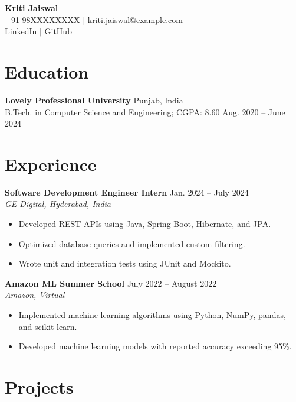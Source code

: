 \documentclass[letterpaper,11pt]{article}
\begin{document}
\begin{center}
    {\LARGE \textbf{Kriti Jaiswal}}\\[4pt]
    +91 98XXXXXXXX \quad $|$ \quad
    \href{mailto:kriti.jaiswal@example.com}{kriti.jaiswal@example.com}\\
    \href{https://linkedin.com/in/kriti-jaiswal1}{LinkedIn}
    \quad $|$ \quad
    \href{https://github.com/kriti-jaiswal}{GitHub}
\end{center}

\section*{Education}

\textbf{Lovely Professional University} \hfill Punjab, India\\
B.Tech. in Computer Science and Engineering; CGPA: 8.60
\hfill Aug. 2020 -- June 2024

\section*{Experience}

\textbf{Software Development Engineer Intern} \hfill Jan. 2024 -- July 2024\\
\textit{GE Digital, Hyderabad, India}

\begin{itemize}
    \item Developed REST APIs using Java, Spring Boot, Hibernate, and JPA.
    \item Optimized database queries and implemented custom filtering.
    \item Wrote unit and integration tests using JUnit and Mockito.
\end{itemize}

\textbf{Amazon ML Summer School} \hfill July 2022 -- August 2022\\
\textit{Amazon, Virtual}

\begin{itemize}
    \item Implemented machine learning algorithms using Python, NumPy, pandas, and scikit-learn.
    \item Developed machine learning models with reported accuracy exceeding 95\%.
\end{itemize}

\section*{Projects}
\end{document}
